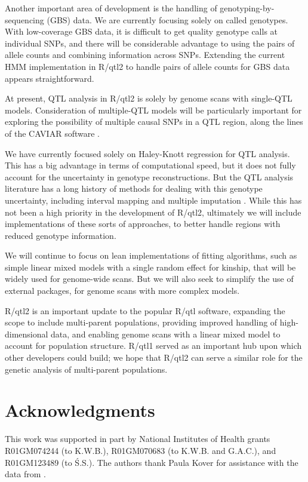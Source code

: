 \documentclass[12pt,letterpaper]{article}
\begin{document}
Another important area of development is the handling of
genotyping-by-sequencing (GBS) data. We are currently focusing solely
on called genotypes. With low-coverage GBS data, it is difficult
to get quality genotype calls at individual SNPs, and there will be
considerable advantage to using the pairs of allele counts and
combining information across SNPs. Extending the current HMM
implementation in R/qtl2 to handle pairs of allele counts for GBS data
appears straightforward.

At present, QTL analysis in R/qtl2 is solely by genome scans with
single-QTL models. Consideration of multiple-QTL models will be
particularly important for exploring the possibility of multiple
causal SNPs in a QTL region, along the lines of the CAVIAR software
\citep{caviar}.

We have currently focused solely on Haley-Knott regression
\citep{haley1992} for QTL analysis. This has a big advantage in terms
of computational speed, but it does not fully account for the
uncertainty in genotype reconstructions. But the QTL analysis
literature has a long history of methods for dealing with this
genotype uncertainty, including
interval mapping \citep{lander1989} and
multiple imputation \citep{sen2001}. While this has not been a high
priority in the development of R/qtl2, ultimately we will include
implementations of these sorts of approaches, to better handle regions
with reduced genotype information.

We will continue to focus on lean implementations of fitting algorithms,
such as simple linear mixed models with a single random effect for kinship,
that will be widely used for genome-wide scans. But we will also seek to
simplify the use of external packages, for genome scans with more complex models.

R/qtl2 is an important update to the popular R/qtl software,
expanding the scope to include multi-parent populations, providing
improved handling of high-dimensional data, and enabling genome scans
with a linear mixed model to account for population structure. R/qtl1
served as an important hub upon which other developers could build; we
hope that R/qtl2 can serve a similar role for the genetic analysis of
multi-parent populations.



\clearpage
\section*{Acknowledgments}

This work was supported in part by National Institutes of Health
grants R01GM074244 (to K.W.B.), R01GM070683 (to K.W.B. and G.A.C.),
and R01GM123489 (to \'S.S.). The authors thank Paula Kover for
assistance with the data from \citet{gnan2014}.


\clearpage

\renewcommand*{\refname}{\normalfont\sffamily\bfseries Literature Cited}

\end{document}
